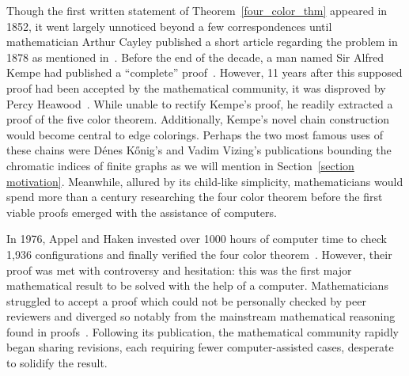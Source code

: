 Though the first written statement of Theorem~\ref{four_color_thm} appeared in 1852, it went largely unnoticed beyond a few correspondences until mathematician Arthur Cayley published a short article regarding the problem in 1878 as mentioned in~\cite{cayley}. Before the end of the decade, a man named Sir Alfred Kempe had published a ``complete'' proof~\cite{FCHistory}. However, 11 years after this supposed proof had been accepted by the mathematical community, it was disproved by Percy Heawood~\cite{heawood1898}. While unable to rectify Kempe's proof, he readily extracted a proof of the five color theorem. Additionally, Kempe's novel chain construction would become central to edge colorings. Perhaps the two most famous uses of these chains were D\'enes K\H{o}nig's and Vadim Vizing's publications bounding the chromatic indices of finite graphs \cite{konig, VizingProof} as we will mention in Section~\ref{section motivation}. Meanwhile, allured by its child-like simplicity, mathematicians would spend more than a century researching the four color theorem before the first viable proofs emerged with the assistance of computers. 

In 1976, Appel and Haken invested over 1000 hours of computer time to check 1,936 configurations and finally verified the four color theorem~\cite{Appel4Color}. However, their proof was met with controversy and hesitation: this was the first major mathematical result to be solved with the help of a computer. Mathematicians struggled to accept a proof which could not be personally checked by peer reviewers and diverged so notably from the mainstream mathematical reasoning found in proofs~\cite{suffices}. Following its publication, the mathematical community rapidly began sharing revisions, each requiring fewer computer-assisted cases, desperate to solidify the result.

